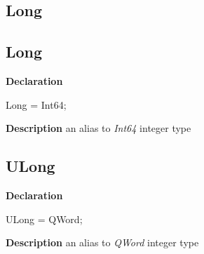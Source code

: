 \documentclass{report}
\newif\ifpdf
\begin{document}
\subsection*{\large{\textbf{Long}}\normalsize\hspace{1ex}\hrulefill}
\else
\subsection*{Long}
\fi
\label{NewPascal.Base-Long}
\begin{list}{}{
\setlength{\itemindent}{0cm}
\setlength{\listparindent}{0cm}
\setlength{\leftmargin}{\evensidemargin}
\addtolength{\leftmargin}{\tmplength}
\settowidth{\labelsep}{X}
\addtolength{\leftmargin}{\labelsep}
\setlength{\labelwidth}{\tmplength}
}
\item[\textbf{Declaration}\hfill]
\ifpdf
\begin{flushleft}
\fi
\begin{ttfamily}
Long = Int64;\end{ttfamily}

\ifpdf
\end{flushleft}
\fi

\par
\item[\textbf{Description}]
an alias to \textit{Int64} integer type

\end{list}
\ifpdf
\subsection*{\large{\textbf{ULong}}\normalsize\hspace{1ex}\hrulefill}
\else
\subsection*{ULong}
\fi
\label{NewPascal.Base-ULong}
\begin{list}{}{
\setlength{\itemindent}{0cm}
\setlength{\listparindent}{0cm}
\setlength{\leftmargin}{\evensidemargin}
\addtolength{\leftmargin}{\tmplength}
\settowidth{\labelsep}{X}
\addtolength{\leftmargin}{\labelsep}
\setlength{\labelwidth}{\tmplength}
}
\item[\textbf{Declaration}\hfill]
\ifpdf
\begin{flushleft}
\fi
\begin{ttfamily}
ULong = QWord;\end{ttfamily}

\ifpdf
\end{flushleft}
\fi

\par
\item[\textbf{Description}]
an alias to \textit{QWord} integer type

\end{list}
\ifpdf
\end{document}
